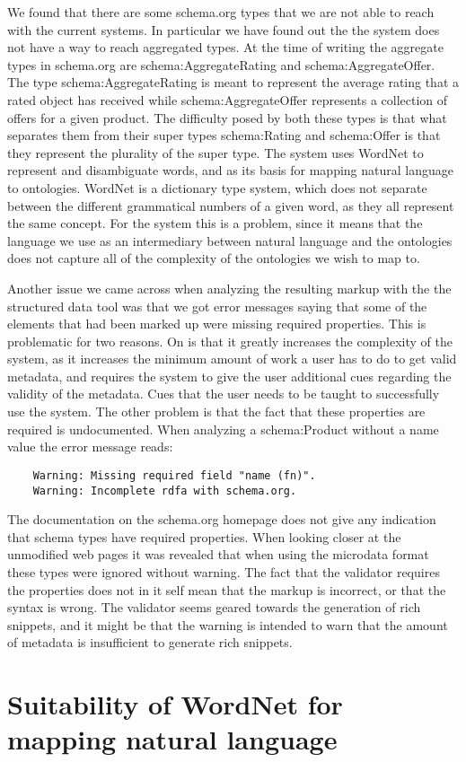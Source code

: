 We found that there are some schema.org types that we are not able to reach with the current systems.
In particular we have found out the the system does not have a way to reach aggregated types.
At the time of writing the aggregate types in schema.org are schema:AggregateRating and schema:AggregateOffer.
The type schema:AggregateRating is meant to represent the average rating that a rated object has received
while schema:AggregateOffer represents a collection of offers for a given product.
The difficulty posed by both these types is that what separates them from their super types schema:Rating and schema:Offer
is that they represent the plurality of the super type.
The system uses WordNet to represent and disambiguate words, and as its basis for mapping natural language to ontologies.
WordNet is a dictionary type system, which does not separate between the different grammatical numbers of a given word,
as they all represent the same concept.
For the system this is a problem, since it means that the language we use as an intermediary between natural language
and the ontologies does not capture all of the complexity of the ontologies we wish to map to.


Another issue we came across when analyzing the resulting markup with the the structured data tool was that we got
error messages saying that some of the elements that had been marked up were missing required properties.
This is problematic for two reasons.
On is that it greatly increases the complexity of the system,
as it increases the minimum amount of work a user has to do to get valid metadata,
and requires the system to give the user additional cues regarding the validity of the metadata.
Cues that the user needs to be taught to successfully use the system.
The other problem is that the fact that these properties are required is undocumented.
When analyzing a schema:Product without a name value the error message reads:
\begin{verbatim}
	Warning: Missing required field "name (fn)".
	Warning: Incomplete rdfa with schema.org.
\end{verbatim}
The documentation on the schema.org homepage does not give any indication that schema types have required properties.
When looking closer at the unmodified web pages it was revealed that when using the microdata format these types
were ignored without warning.
The fact that the validator requires the properties does not in it self mean that the markup is incorrect,
or that the syntax is wrong.
The validator seems geared towards the generation of rich snippets,
and it might be that the warning is intended to warn that the amount of metadata is insufficient to generate rich snippets.


\section{Suitability of WordNet for mapping natural language}
